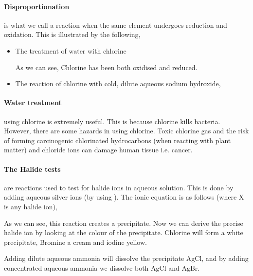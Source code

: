 	\paragraph{Disproportionation} is what we call a reaction when the same element undergoes reduction and oxidation.
	This is illustrated by the following,
	\begin{itemize}
		\item The treatment of water with chlorine
		
		
		As we can see, Chlorine has been both oxidised and reduced.
		
		\item The reaction of chlorine with cold, dilute aqueous sodium hydroxide,
		
	\end{itemize}
	
	\paragraph{Water treatment} using chlorine is extremely useful.
	This is because chlorine kills bacteria.
	However, there are some hazards in using chlorine.
	Toxic chlorine gas and the risk of forming carcinogenic chlorinated hydrocarbons (when reacting with plant matter) and chloride ions can damage human tissue i.e. cancer.
	
	\paragraph{The Halide tests} are reactions used to test for halide ions in aqueous solution.
	This is done by adding aqueous silver ions (by using ).
	The ionic equation is as follows (where X is any halide ion),
	
	\begin{center}
	\end{center}
	
	As we can see, this reaction creates a precipitate.
	Now we can derive the precise halide ion by looking at the colour of the precipitate.
	Chlorine will form a white precipitate, Bromine a cream and iodine yellow.
	
	Adding dilute aqueous ammonia will dissolve the precipitate AgCl, and by adding concentrated aqueous ammonia we dissolve both AgCl and AgBr.
	
